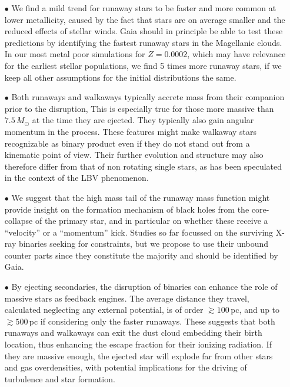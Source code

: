 \documentclass{aa}
\begin{document}
\begin{itemize}
\item[$\bullet$] We find a mild trend for runaway stars to be faster
  and more common at lower metallicity, caused by the fact that stars are on average smaller and the reduced effects of stellar winds.   Gaia should in principle be able to test these predictions by identifying the fastest runaway stars in the Magellanic clouds. In our most metal poor simulations for $Z=0.0002$, which may have relevance for the earliest stellar populations, we find 5 times more runaway stars, if we keep all other assumptions for the initial distributions the same.

\item[$\bullet$] Both runaways and walkaways typically accrete mass from their
companion prior to the disruption, This is especially true for those more massive than
$7.5\,M_\odot$ at the time they are ejected. They typically also gain angular momentum in the process. These features might make walkaway stars recognizable as binary product even if they do not stand out from a kinematic point of view. Their further evolution and structure may also therefore differ from that of non rotating single stars, as has been speculated in the context of the LBV phenomenon.  

\item[$\bullet$] We suggest that the high mass tail of the runaway
  mass function might provide insight on the formation mechanism of
  black holes from the core-collapse of the primary star, and in particular on whether these receive a ``velocity'' or a ``momentum''
kick. Studies so far focussed on the surviving X-ray binaries seeking for constraints, but we propose to use their unbound counter parts since they constitute the majority and should be identified by Gaia. 

\item[$\bullet$] By ejecting secondaries, the disruption of binaries can enhance the role of
massive stars as feedback engines. The average distance they travel,
calculated neglecting any external potential, is of order
$\gtrsim100$\,pc, and up to $\gtrsim 500$\,pc if considering only the
faster runaways. These suggests that both runaways and walkaways
can exit the dust cloud embedding their birth location, thus enhancing
the escape fraction for their ionizing radiation. If they are massive
enough, the ejected star will explode far from other stars and gas
overdensities, with potential implications for the driving of
turbulence and star formation. 

\end{itemize}
\end{document}

